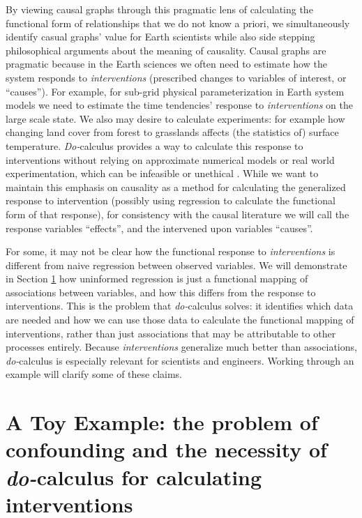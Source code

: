 \documentclass[12pt]{article}
\begin{document}
By viewing causal graphs through this pragmatic lens of calculating
the functional form of relationships that we do not know a priori, we
simultaneously identify casual graphs' value for Earth scientists
while also side stepping philosophical arguments about the meaning of
causality. Causal graphs are pragmatic because in the Earth sciences
we often need to estimate how the system responds to
\emph{interventions} (prescribed changes to variables of interest, or
``causes''). For example, for sub-grid physical parameterization in Earth system models we need to
estimate the time tendencies' response to \emph{interventions} on the
large scale state. We also may desire to calculate experiments: for
example how changing land cover from forest to grasslands affects (the
statistics of) surface temperature. \textit{Do-}calculus provides a
way to calculate this response to interventions without relying on
approximate numerical models or real world experimentation, which can
be infeasible or unethical \citep[as is the case for geoengineering;
e.g., unilateral decisions to seed the oceans with iron, or spray
aerosols in the atmosphere,][]{hamilton2013no}. While we want to
maintain this emphasis on causality as a method for calculating the
generalized response to intervention (possibly using regression to
calculate the functional form of that response), for consistency with
the causal literature we will call the response variables ``effects'',
and the intervened upon variables ``causes''.

For some, it may not be clear how the functional response to
\emph{interventions} is different from naive regression between
observed variables. We will demonstrate in Section
\ref{sec:causal-graphs-pearls} how uninformed regression is just a
functional mapping of associations between variables, and how this
differs from the response to interventions. This is the problem that
\textit{do-}calculus solves: it identifies which data are needed and
how we can use those data to calculate the functional mapping of
interventions, rather than just associations that may be attributable
to other processes entirely. Because \emph{interventions} generalize
much better than associations, \textit{do-}calculus is especially
relevant for scientists and engineers. Working through an example will
clarify some of these claims.

\section{A Toy Example: the problem of confounding and the necessity
  of \textit{do-}calculus for calculating interventions}
\label{sec:causal-graphs-pearls}
\end{document}
